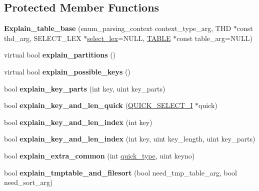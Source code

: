 \subsection*{Protected Member Functions}
\begin{DoxyCompactItemize}
\item 
\mbox{\label{classExplain__table__base_abbad2286bbba8a5025cd6559f7223124}} 
{\bfseries Explain\+\_\+table\+\_\+base} (enum\+\_\+parsing\+\_\+context context\+\_\+type\+\_\+arg, T\+HD $\ast$const thd\+\_\+arg, S\+E\+L\+E\+C\+T\+\_\+\+L\+EX $\ast$\mbox{\hyperlink{classExplain_ad66987d49df1e5712c2af2f646561503}{select\+\_\+lex}}=N\+U\+LL, \mbox{\hyperlink{structTABLE}{T\+A\+B\+LE}} $\ast$const table\+\_\+arg=N\+U\+LL)
\item 
\mbox{\label{classExplain__table__base_a3892a0d83c0f42dc3f66a39f27df9c4d}} 
virtual bool {\bfseries explain\+\_\+partitions} ()
\item 
\mbox{\label{classExplain__table__base_a3f377908e466093707a647de61e08aa5}} 
virtual bool {\bfseries explain\+\_\+possible\+\_\+keys} ()
\item 
\mbox{\label{classExplain__table__base_a8e3124ad74a5dfed6a11d999579ad35b}} 
bool {\bfseries explain\+\_\+key\+\_\+parts} (int key, uint key\+\_\+parts)
\item 
\mbox{\label{classExplain__table__base_a45c82b767a78fcb1ffb4f0116bb32513}} 
bool {\bfseries explain\+\_\+key\+\_\+and\+\_\+len\+\_\+quick} (\mbox{\hyperlink{classQUICK__SELECT__I}{Q\+U\+I\+C\+K\+\_\+\+S\+E\+L\+E\+C\+T\+\_\+I}} $\ast$quick)
\item 
\mbox{\label{classExplain__table__base_a095dcffc40ea66e5a2d40e4639a01baa}} 
bool {\bfseries explain\+\_\+key\+\_\+and\+\_\+len\+\_\+index} (int key)
\item 
\mbox{\label{classExplain__table__base_a1c709bff47c2ddce47158dd3bcaa64b4}} 
bool {\bfseries explain\+\_\+key\+\_\+and\+\_\+len\+\_\+index} (int key, uint key\+\_\+length, uint key\+\_\+parts)
\item 
\mbox{\label{classExplain__table__base_a91b4a8369974ffc4037fd4f45af55b06}} 
bool {\bfseries explain\+\_\+extra\+\_\+common} (int \mbox{\hyperlink{sql__select_8h_a931d06905210c0f917b25d180eeb643f}{quick\+\_\+type}}, uint keyno)
\item 
\mbox{\label{classExplain__table__base_a08d78d30646d539c77ab0ffa81edaad0}} 
bool {\bfseries explain\+\_\+tmptable\+\_\+and\+\_\+filesort} (bool need\+\_\+tmp\+\_\+table\+\_\+arg, bool need\+\_\+sort\+\_\+arg)
\end{DoxyCompactItemize}
